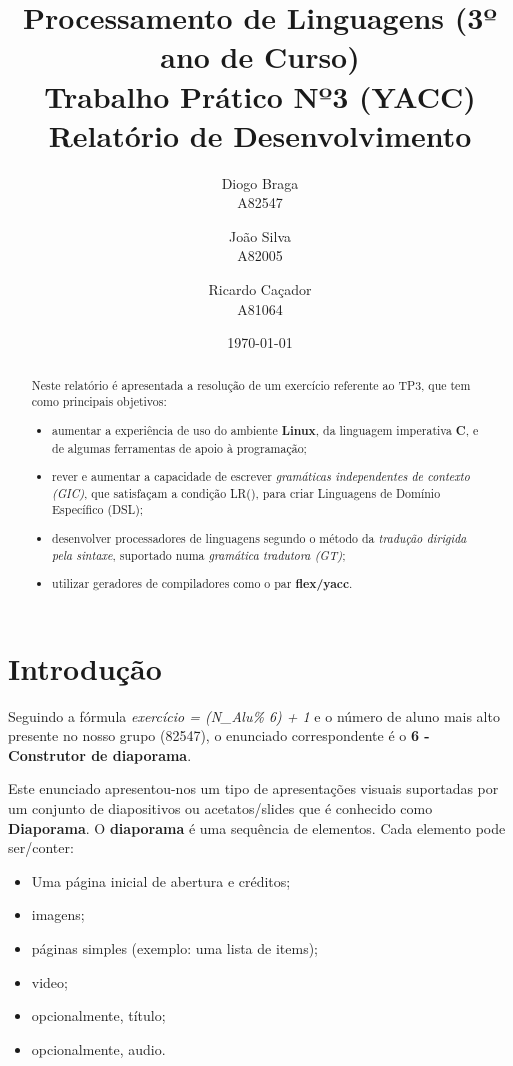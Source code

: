 \documentclass[11pt,a4paper]{report}
\title{Processamento de Linguagens (3º ano de Curso)\\
	\textbf{Trabalho Prático Nº3 (YACC)}\\ Relatório de Desenvolvimento}
\author{Diogo Braga\\ A82547 \and João Silva\\ A82005 \and Ricardo Caçador\\ A81064}
\date{\today}
\begin{document}
\maketitle

\begin{abstract}
	Neste relatório é apresentada a resolução de um exercício referente ao TP3, que tem como principais objetivos:
	\begin{itemize}
		\item aumentar a experiência de uso do ambiente \textbf{Linux}, da linguagem imperativa  \textbf{C}, e de algumas ferramentas de apoio à programação;
 		\item rever e aumentar a capacidade de escrever \textit{gramáticas independentes de contexto (GIC)}, que satisfaçam a condição LR(), para criar Linguagens de Domínio Específico (DSL);
 		\item desenvolver processadores de linguagens segundo o método da \textit{tradução dirigida pela sintaxe}, suportado numa \textit{gramática tradutora (GT)};
 		\item utilizar geradores de compiladores como o par \textbf{flex/yacc}.
	\end{itemize}
\end{abstract}

\tableofcontents

\newpage

\chapter{Introdução}
\label{chap:intro}

Seguindo a fórmula \emph{exercício = (N\_Alu\% 6)  +  1} e o número de aluno mais alto presente no nosso grupo (82547), o enunciado correspondente é o \textbf{6  -  Construtor de diaporama}.

Este enunciado apresentou-nos um tipo de apresentações visuais suportadas por um conjunto de diapositivos ou acetatos/slides que é conhecido como \textbf{Diaporama}. O \textbf{diaporama} é uma sequência de elementos. Cada elemento pode ser/conter:
\begin{itemize}
	\item Uma página inicial de abertura e créditos;
	\item imagens;
	\item páginas simples (exemplo:  uma lista de items);
	\item video;
	\item opcionalmente, título;
	\item opcionalmente, audio.
\end{itemize}
\end{document}
